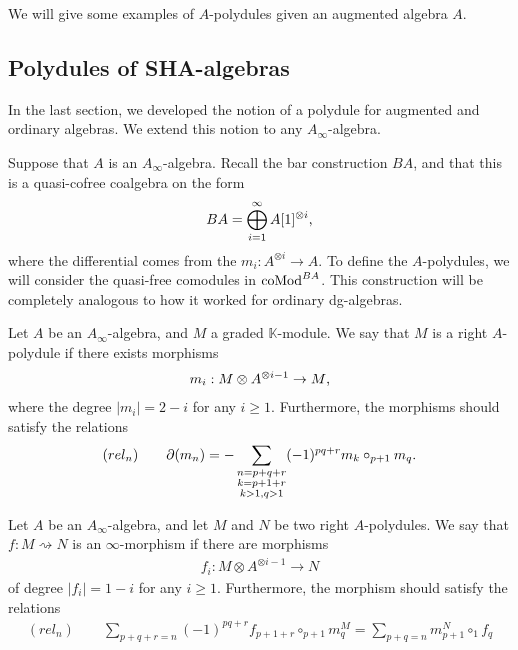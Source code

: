 \documentclass[../thesis.tex]{subfiles}
\begin{document}
            We will give some examples of $A$-polydules given an augmented algebra $A$.\todo{!!!}

        \subsection{Polydules of SHA-algebras}
            In the last section, we developed the notion of a polydule for augmented and ordinary algebras. We extend this notion to any $A_\infty$-algebra.

            Suppose that $A$ is an $A_\infty$-algebra. Recall the bar construction $BA$, and that this is a quasi-cofree coalgebra on the form
            \begin{align*}
                BA = \bigoplus_{i=1}^\infty A[1]^{\otimes i}\tt{,}
            \end{align*}
            where the differential comes from the $m_i : A^{\otimes i} \rightarrow A$. To define the $A$-polydules, we will consider the quasi-free comodules in $\tt{coMod}^{BA}$. This construction will be completely analogous to how it worked for ordinary dg-algebras.
            
            \begin{definition}[$A$-polydule]
                Let $A$ be an $A_\infty$-algebra, and $M$ a graded $\mathbb{K}$-module. We say that $M$ is a right $A$-polydule if there exists morphisms
                \begin{align*}
                    m_i : M \otimes A^{\otimes i - 1} \rightarrow M\tt{,}
                \end{align*}
                where the degree $|m_i| = 2 - i$ for any $i \geq 1$. Furthermore, the morphisms should satisfy the relations
                \begin{align*}
                    (rel_n) \qquad \partial(m_n) = - \sum_{\substack{n = p + q + r \\ k = p + 1 + r \\ k > 1, q > 1}}(-1)^{pq+r}m_k\circ_{p+1}m_q\tt{.}
                \end{align*}
            \end{definition}

            \begin{definition}
                Let $A$ be an $A_\infty$-algebra, and let $M$ and $N$ be two right $A$-polydules. We say that $f : M \rightsquigarrow N$ is an $\infty$-morphism if there are morphisms
                \begin{align*}
                    f_i : M \otimes A^{\otimes i - 1} \rightarrow N
                \end{align*}
                of degree $|f_i| = 1 - i$ for any $i \geq 1$. Furthermore, the morphism should satisfy the relations
                \begin{align*}
                    (rel_n)\qquad \sum_{p+q+r = n} (-1)^{pq+r}f_{p+1+r} \circ_{p+1} m^M_{q} = \sum_{p+q = n} m^N_{p+1} \circ_1 f_q
                \end{align*}
            \end{definition}
\end{document}

